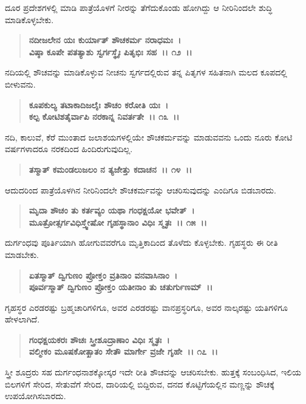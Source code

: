 ದೂರ ಪ್ರದೇಶಗಳಲ್ಲಿ ಮಾಡಿ ಪಾತ್ರೆಯೊಳಗೆ ನೀರನ್ನು ತೆಗೆದುಕೊಂಡು ಹೋಗಿದ್ದು ಆ ನೀರಿನಿಂದಲೇ ಶುದ್ಧಿ ಮಾಡಿಕೊಳ್ಳಬೇಕು.

\begin{verse}
\textbf{ನದೀಜಲೇನ ಯಃ ಕುರ್ಯಾತ್ ಶೌಚಕರ್ಮ ನರಾಧಮಃ~।}\\\textbf{ವಿಷ್ಠಾ ಕೂಪೇ ಪತತ್ಯಾಶು ಸ್ವರ್ಗಸ್ಥೈಃ ಪಿತೃಭಿಃ ಸಹ~।। ೧೨~।।}
\end{verse}

ನದಿಯಲ್ಲಿ ಶೌಚವನ್ನು ಮಾಡಿಕೊಳ್ಳುವ ನೀಚನು ಸ್ವರ್ಗದಲ್ಲಿರುವ ತನ್ನ ಪಿತೃಗಳ ಸಹಿತನಾಗಿ ಮಲದ ಕೂಪದಲ್ಲಿ ಬೀಳುವನು.

\begin{verse}
\textbf{ಕೂಪಕುಲ್ಯ ತಟಾಕಾದಿಜಲೈಃ ಶೌಚಂ ಕರೋತಿ ಯಃ~।}\\\textbf{ಕಲ್ಪ ಕೋಟಿಶತೈರ್ವಾಪಿ ನರಕಾನ್ನ ನಿವರ್ತತೇ~।। ೧೩~।।}
\end{verse}

ನದಿ, ಕಾಲುವೆ, ಕೆರೆ ಮುಂತಾದ ಜಲಾಶಯಗಳಲ್ಲಿಯೇ ಶೌಚಕರ್ಮವನ್ನು ಮಾಡುವವನು ಒಂದು ನೂರು ಕೋಟಿ ವರ್ಷಗಳಾದರೂ ನರಕದಿಂದ ಹಿಂದಿರುಗುವುದಿಲ್ಲ.

\begin{verse}
\textbf{ತಸ್ಮಾತ್ ಕಮಂಡಲುಜಲಂ ನ ತ್ಯಜೇತ್ತು ಕದಾಚನ~।। ೧೪~।।}
\end{verse}

ಆದುದರಿಂದ ಪಾತ್ರೆಯೊಳಗಿನ ನೀರಿನಿಂದಲೇ ಶೌಚಕರ್ಮವನ್ನು ಆಚರಿಸುವುದನ್ನು ಎಂದಿಗೂ ಬಿಡಬಾರದು.

\begin{verse}
\textbf{ಮೃದಾ ಶೌಚಂ ತು ಕರ್ತವ್ಯಂ ಯಥಾ ಗಂಧಕ್ಷಯೋ ಭವೇತ್~।}\\\textbf{ಮೂತ್ರೋತ್ಸರ್ಗವಿಧಿಸ್ತ್ವೇಷೋ ಗೃಹಸ್ಥಾನಾಂ ವಿಧಿಃ ಸ್ಮೃತಃ~।। ೧೫~।।}
\end{verse}

ದುರ್ಗಂಧವು ಪೂರ್ತಿಯಾಗಿ ಹೋಗುವವರೆಗೂ ಮೃತ್ತಿಕಾದಿಂದ ತೊಳೆದು ಕೊಳ್ಳಬೇಕು. ಗೃಹಸ್ಥರು ಈ ರೀತಿ ಮಾಡಬೇಕು.

\begin{verse}
\textbf{ಏತಸ್ಮಾತ್ ದ್ವಿಗುಣಂ ಪ್ರೋಕ್ತಂ ವ್ರತಿನಾಂ ವನವಾಸಿನಾಂ~।}\\\textbf{ಪೂರ್ವಸ್ಮಾತ್ ದ್ವಿಗುಣಂ ಪ್ರೋಕ್ತಂ ಯತೀನಾಂ ತು ಚತುರ್ಗುಣಮ್~।।}
\end{verse}

ಗೃಹಸ್ಥರ ಎರಡರಷ್ಟು ಬ್ರಹ್ಮಚಾರಿಗಳಿಗೂ, ಅವರ ಎರಡರಷ್ಟು ವಾನಪ್ರಸ್ಥರಿಗೂ, ಅವರ ನಾಲ್ಕರಷ್ಟು ಯತಿಗಳಿಗೂ ಹೇಳಲಾಗಿದೆ.

\begin{verse}
\textbf{ಗಂಧಕ್ಷಯಕರಃ ಶೌಚಃ ಸ್ತ್ರೀಶೂದ್ರಾಣಾಂ ವಿಧಿಃ ಸ್ಮೃತಃ~।}\\\textbf{ವಲ್ಮೀಕಂ ಮೂಷಕೋತ್ಖಾತಂ ಸೇತೌ ಮಾರ್ಗೇ ವ್ರಜೇ ಗೃಹೇ~।। ೧೭~।।}
\end{verse}

ಸ್ತ್ರೀ ಶೂದ್ರರು ಸಹ ದುರ್ಗಂಧನಾಶಕ್ಕೋಸ್ಕರ ಇದೇ ರೀತಿ ಶೌಚವನ್ನು ಆಚರಿಸಬೇಕು. ಹುತ್ತಕ್ಕೆ ಸಂಬಂಧಿಸಿದ, ಇಲಿಯ ಬಿಲಗಳಿಗೆ ಸೇರಿದ, ಸೇತುವೆಗೆ ಸೇರಿದ, ದಾರಿಯಲ್ಲಿ ಬಿದ್ದಿರುವ, ದನದ ಕೊಟ್ಟಿಗೆಯಲ್ಲಿನ ಮಣ್ಣನ್ನು ಶೌಚಕ್ಕೆ ಉಪಯೋಗಿಸಬಾರದು.

